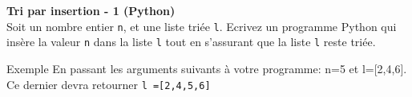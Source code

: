\begin{Exercice}[10 minutes] \textbf{Tri par insertion - 1 (Python)}\\
    Soit un nombre entier \lstinline{n}, et une liste triée \lstinline{l}. Ecrivez un programme Python qui insère la valeur \lstinline{n} dans la liste \lstinline{l} tout en s'assurant que la liste \lstinline{l} reste triée.

    

    \begin{Example}{\faTerminal \quad Exemple}
        En passant les arguments suivants à votre programme: n=5 et l=[2,4,6]. Ce dernier devra retourner \lstinline{l =[2,4,5,6]}
    \end{Example}

    \begin{solution}
        
    \end{solution}


\end{Exercice}

